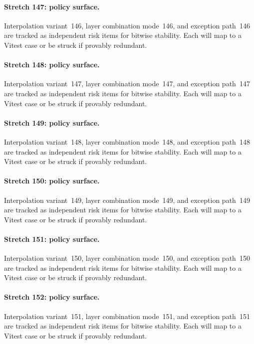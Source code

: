 \documentclass[sigconf,nonacm]{acmart}
\begin{document}
\paragraph{Stretch 147: policy surface.}
Interpolation variant~146, layer combination mode~146, and exception path~146 are tracked as independent risk items for bitwise stability. Each will map to a Vitest case or be struck if provably redundant. %

\paragraph{Stretch 148: policy surface.}
Interpolation variant~147, layer combination mode~147, and exception path~147 are tracked as independent risk items for bitwise stability. Each will map to a Vitest case or be struck if provably redundant. %

\paragraph{Stretch 149: policy surface.}
Interpolation variant~148, layer combination mode~148, and exception path~148 are tracked as independent risk items for bitwise stability. Each will map to a Vitest case or be struck if provably redundant. %

\paragraph{Stretch 150: policy surface.}
Interpolation variant~149, layer combination mode~149, and exception path~149 are tracked as independent risk items for bitwise stability. Each will map to a Vitest case or be struck if provably redundant. %

\paragraph{Stretch 151: policy surface.}
Interpolation variant~150, layer combination mode~150, and exception path~150 are tracked as independent risk items for bitwise stability. Each will map to a Vitest case or be struck if provably redundant. %

\paragraph{Stretch 152: policy surface.}
Interpolation variant~151, layer combination mode~151, and exception path~151 are tracked as independent risk items for bitwise stability. Each will map to a Vitest case or be struck if provably redundant. %
\end{document}
